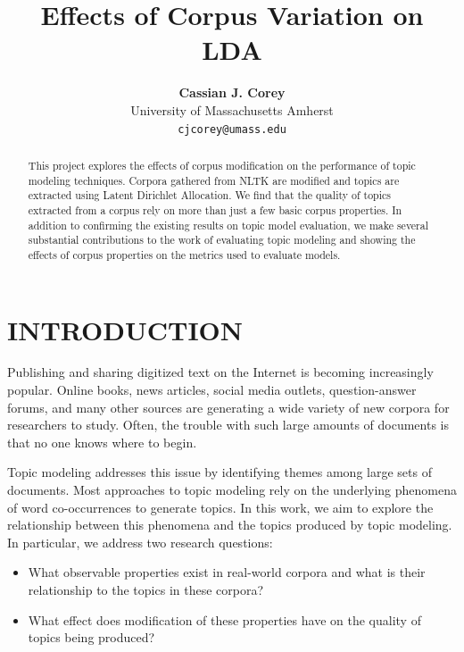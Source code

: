 \documentclass[letterpaper, 10 pt, conference]{ieeeconf}  %
\title{\LARGE \bf
Effects of Corpus Variation on LDA
}
\author{ \parbox{3 in}{\centering \textbf{Cassian J. Corey} \\
        University of Massachusetts Amherst\\
        {\tt\small cjcorey@umass.edu}}
        \hspace*{ 0.5 in}
}
\begin{document}
\maketitle
\thispagestyle{empty}
\pagestyle{empty}


\begin{abstract}

This project explores the effects of corpus modification on the performance of topic modeling techniques. Corpora gathered from NLTK are modified and topics are extracted using Latent Dirichlet Allocation. We find that the quality of topics extracted from a corpus rely on more than just a few basic corpus properties. In addition to confirming the existing results on topic model evaluation, we make several substantial contributions to the work of evaluating topic modeling and showing the effects of corpus properties on the metrics used to evaluate models.

\end{abstract}


\section{INTRODUCTION}

Publishing and sharing digitized text on the Internet is becoming increasingly popular. Online books, news articles, social media outlets, question-answer forums, and many other sources are generating a wide variety of new corpora for researchers to study. Often, the trouble with such large amounts of documents is that no one knows where to begin.

Topic modeling addresses this issue by identifying themes among large sets of documents. Most approaches to topic modeling rely on the underlying phenomena of word co-occurrences to generate topics. In this work, we aim to explore the relationship between this phenomena and the topics produced by topic modeling. In particular, we address two research questions:
\begin{itemize}
\item What observable properties exist in real-world corpora and what is their relationship to the topics in these corpora?
\item What effect does modification of these properties have on the quality of topics being produced?
\end{itemize}
\end{document}
